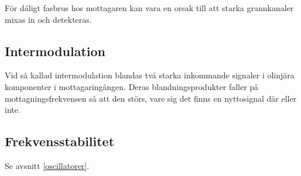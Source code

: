 För dåligt fasbrus hos mottagaren kan vara en orsak till att starka
grannkanaler mixas in och detekteras.

\subsection{Intermodulation}

Vid så kallad intermodulation blandas två starka inkommande signaler i olinjära
komponenter i mottagaringången.
Deras blandningsprodukter faller på mottagningsfrekvensen så att den störs,
vare sig det finns en nyttosignal där eller inte.

\subsection{Frekvensstabilitet}

Se avsnitt \ref{oscillatorer}.
